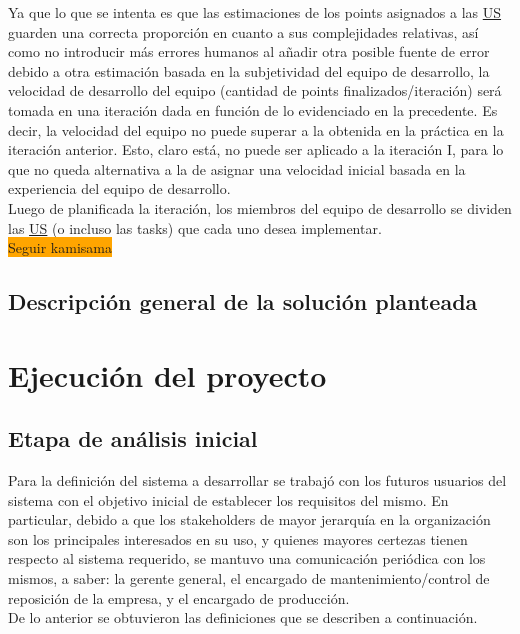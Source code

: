 \documentclass[a4paper, 12pt,twoside]{report}  %
\numberwithin{equation}{subsection} %
\begin{document}
\indent Ya que lo que se intenta es que las estimaciones de los points asignados a las \hyperlink{US}{US} guarden una correcta proporción en cuanto a sus complejidades relativas, así como no introducir más errores humanos al añadir otra posible fuente de error debido a otra estimación basada en la subjetividad del equipo de desarrollo, la velocidad de desarrollo del equipo (cantidad de points finalizados/iteración) será tomada en una iteración dada en función de lo evidenciado en la precedente. Es decir, la velocidad del equipo no puede superar a la obtenida en la práctica en la iteración anterior. Esto, claro está, no puede ser aplicado a la iteración I, para lo que no queda alternativa a la de asignar una velocidad inicial basada en la experiencia del equipo de desarrollo.\\
\indent Luego de planificada la iteración, los miembros del equipo de desarrollo se dividen las \hyperlink{US}{US} (o incluso las tasks) que cada uno desea implementar.\\
\indent\colorbox{orange}{Seguir kamisama}

\section{Descripción general de la solución planteada}

\chapter{Ejecución del proyecto}
\section{Etapa de análisis inicial}

Para la definición del sistema a desarrollar se trabajó con los futuros usuarios del sistema con el objetivo inicial de establecer los requisitos del mismo. En particular, debido a que los stakeholders de mayor jerarquía en la organización son los principales interesados en su uso, y quienes mayores certezas tienen respecto al sistema requerido, se mantuvo una comunicación periódica con los mismos, a saber: la gerente general, el encargado de mantenimiento/control de reposición de la empresa, y el encargado de producción.\\
\indent De lo anterior se obtuvieron las definiciones que se describen a continuación.
\end{document}
